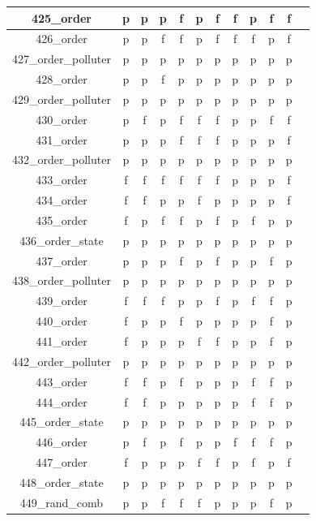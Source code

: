 \documentclass[
fancyheadings, %
%
%
]{stsreprt}
\begin{document}
\begin{longtable}{|c|c|c|c|c|c|c|c|c|c|c|c|}
425\_order & p & p & p & f & p & f & f & p & f & f \\
\hline
426\_order & p & p & f & f & p & f & f & f & p & f \\
\hline
427\_order\_polluter & p & p & p & p & p & p & p & p & p & p \\
\hline
428\_order & p & p & f & p & p & p & p & p & p & p \\
\hline
429\_order\_polluter & p & p & p & p & p & p & p & p & p & p \\
\hline
430\_order & p & f & p & f & f & f & p & p & f & f \\
\hline
431\_order & p & p & p & f & f & f & p & p & p & f \\
\hline
432\_order\_polluter & p & p & p & p & p & p & p & p & p & p \\
\hline
433\_order & f & f & f & f & f & f & p & p & p & f \\
\hline
434\_order & f & f & p & p & f & p & p & p & p & f \\
\hline
435\_order & f & p & f & f & p & f & p & f & p & p \\
\hline
436\_order\_state & p & p & p & p & p & p & p & p & p & p \\
\hline
437\_order & p & p & p & f & p & f & p & p & f & p \\
\hline
438\_order\_polluter & p & p & p & p & p & p & p & p & p & p \\
\hline
439\_order & f & f & f & p & p & f & p & f & f & p \\
\hline
440\_order & f & p & p & f & p & p & p & p & f & p \\
\hline
441\_order & f & p & p & p & f & f & p & p & f & p \\
\hline
442\_order\_polluter & p & p & p & p & p & p & p & p & p & p \\
\hline
443\_order & f & f & p & f & p & p & p & f & f & p \\
\hline
444\_order & f & f & p & p & p & p & p & f & f & p \\
\hline
445\_order\_state & p & p & p & p & p & p & p & p & p & p \\
\hline
446\_order & p & f & p & f & p & p & f & f & f & p \\
\hline
447\_order & f & p & p & p & f & f & p & f & p & f \\
\hline
448\_order\_state & p & p & p & p & p & p & p & p & p & p \\
\hline
449\_rand\_comb & p & p & f & f & f & p & p & p & f & p \\
\hline

\end{longtable}
\end{document}
